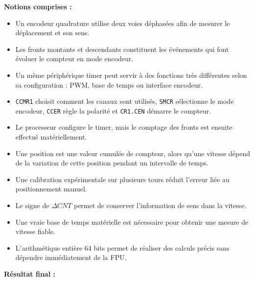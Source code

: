 \documentclass[11pt,a4paper]{article}
\begin{document}
\begin{sessionbox}
		\vspace{0.3cm}
		
		\textbf{Notions comprises :}
		
		\begin{itemize}
			\item Un encodeur quadrature utilise deux voies déphasées afin de mesurer le déplacement et son sens.
			\item Les fronts montants et descendants constituent les événements qui font évoluer le compteur en mode encodeur.
			\item Un même périphérique timer peut servir à des fonctions très différentes selon sa configuration : PWM, base de temps ou interface encodeur.
			\item \texttt{CCMR1} choisit comment les canaux sont utilisés, \texttt{SMCR} sélectionne le mode encodeur, \texttt{CCER} règle la polarité et \texttt{CR1.CEN} démarre le compteur.
			\item Le processeur configure le timer, mais le comptage des fronts est ensuite effectué matériellement.
			\item Une position est une valeur cumulée de compteur, alors qu'une vitesse dépend de la variation de cette position pendant un intervalle de temps.
			\item Une calibration expérimentale sur plusieurs tours réduit l'erreur liée au positionnement manuel.
			\item Le signe de $\Delta CNT$ permet de conserver l'information de sens dans la vitesse.
			\item Une vraie base de temps matérielle est nécessaire pour obtenir une mesure de vitesse fiable.
			\item L'arithmétique entière 64 bits permet de réaliser des calculs précis sans dépendre immédiatement de la FPU.
		\end{itemize}
		
		\vspace{0.3cm}
		
		\textbf{Résultat final :}
		
		\begin{center}
		\end{center}
		

\end{sessionbox}
\end{document}
